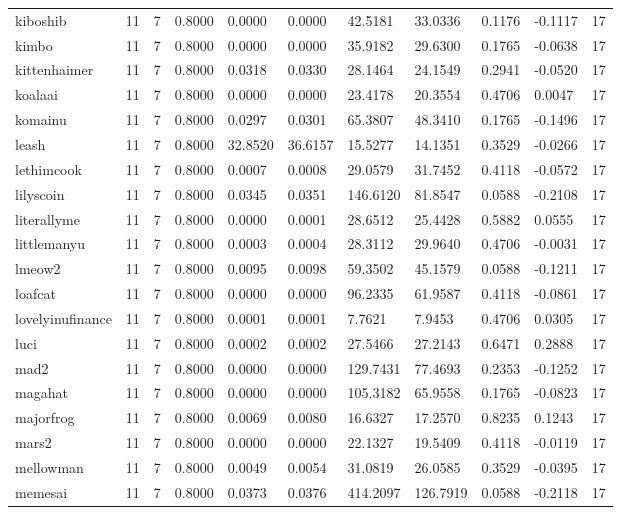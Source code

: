 \begin{table}[htbp]
\begin{tabular}{lllllllllll}
kiboshib & 11 & 7 & 0.8000 & 0.0000 & 0.0000 & 42.5181 & 33.0336 & 0.1176 & -0.1117 & 17 \\
kimbo & 11 & 7 & 0.8000 & 0.0000 & 0.0000 & 35.9182 & 29.6300 & 0.1765 & -0.0638 & 17 \\
kittenhaimer & 11 & 7 & 0.8000 & 0.0318 & 0.0330 & 28.1464 & 24.1549 & 0.2941 & -0.0520 & 17 \\
koalaai & 11 & 7 & 0.8000 & 0.0000 & 0.0000 & 23.4178 & 20.3554 & 0.4706 & 0.0047 & 17 \\
komainu & 11 & 7 & 0.8000 & 0.0297 & 0.0301 & 65.3807 & 48.3410 & 0.1765 & -0.1496 & 17 \\
leash & 11 & 7 & 0.8000 & 32.8520 & 36.6157 & 15.5277 & 14.1351 & 0.3529 & -0.0266 & 17 \\
lethimcook & 11 & 7 & 0.8000 & 0.0007 & 0.0008 & 29.0579 & 31.7452 & 0.4118 & -0.0572 & 17 \\
lilyscoin & 11 & 7 & 0.8000 & 0.0345 & 0.0351 & 146.6120 & 81.8547 & 0.0588 & -0.2108 & 17 \\
literallyme & 11 & 7 & 0.8000 & 0.0000 & 0.0001 & 28.6512 & 25.4428 & 0.5882 & 0.0555 & 17 \\
littlemanyu & 11 & 7 & 0.8000 & 0.0003 & 0.0004 & 28.3112 & 29.9640 & 0.4706 & -0.0031 & 17 \\
lmeow2 & 11 & 7 & 0.8000 & 0.0095 & 0.0098 & 59.3502 & 45.1579 & 0.0588 & -0.1211 & 17 \\
loafcat & 11 & 7 & 0.8000 & 0.0000 & 0.0000 & 96.2335 & 61.9587 & 0.4118 & -0.0861 & 17 \\
lovelyinufinance & 11 & 7 & 0.8000 & 0.0001 & 0.0001 & 7.7621 & 7.9453 & 0.4706 & 0.0305 & 17 \\
luci & 11 & 7 & 0.8000 & 0.0002 & 0.0002 & 27.5466 & 27.2143 & 0.6471 & 0.2888 & 17 \\
mad2 & 11 & 7 & 0.8000 & 0.0000 & 0.0000 & 129.7431 & 77.4693 & 0.2353 & -0.1252 & 17 \\
magahat & 11 & 7 & 0.8000 & 0.0000 & 0.0000 & 105.3182 & 65.9558 & 0.1765 & -0.0823 & 17 \\
majorfrog & 11 & 7 & 0.8000 & 0.0069 & 0.0080 & 16.6327 & 17.2570 & 0.8235 & 0.1243 & 17 \\
mars2 & 11 & 7 & 0.8000 & 0.0000 & 0.0000 & 22.1327 & 19.5409 & 0.4118 & -0.0119 & 17 \\
mellowman & 11 & 7 & 0.8000 & 0.0049 & 0.0054 & 31.0819 & 26.0585 & 0.3529 & -0.0395 & 17 \\
memesai & 11 & 7 & 0.8000 & 0.0373 & 0.0376 & 414.2097 & 126.7919 & 0.0588 & -0.2118 & 17 \\

\end{tabular}
\end{table}
